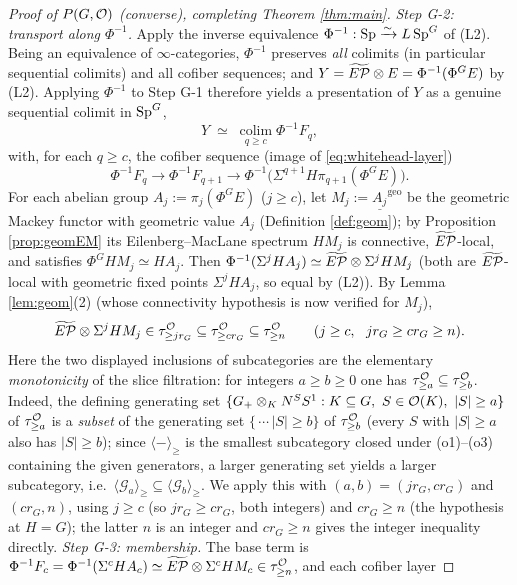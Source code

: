 \begin{proof}[Proof of $P(G,\mathcal{O})$ (converse), completing Theorem \ref{thm:main}]
\emph{Step G-2: transport along $\Phi^{-1}$.} Apply the inverse
equivalence $\Phi^{-1}:\mathrm{Sp}\xrightarrow{\sim}L\,\mathrm{Sp}^G$ of (L2). Being an
equivalence of $\infty$-categories, $\Phi^{-1}$ preserves \emph{all} colimits (in
particular sequential colimits) and all cofiber sequences; and
$Y=\widetilde{E\mathcal P}\otimes E=\Phi^{-1}(\Phi^G E)$ by (L2). Applying $\Phi^{-1}$ to Step G-1
therefore yields a presentation of $Y$ as a genuine sequential colimit in
$\mathrm{Sp}^G$,
\[
Y\;\simeq\;\operatorname*{colim}_{q\ge c}\Phi^{-1}F_q,
\]
with, for each $q\ge c$, the cofiber sequence (image of \eqref{eq:whitehead-layer})
\[
\Phi^{-1}F_q\longrightarrow\Phi^{-1}F_{q+1}\longrightarrow
\Phi^{-1}\bigl(\Sigma^{q+1}H\pi_{q+1}(\Phi^G E)\bigr).
\]
For each abelian group $A_j:=\pi_j(\Phi^G E)$ ($j\ge c$), let
$M_j:=\underline{A_j}^{\mathrm{geo}}$ be the geometric Mackey functor with
geometric value $A_j$ (Definition \ref{def:geom}); by Proposition
\ref{prop:geomEM} its Eilenberg--MacLane spectrum $HM_j$ is connective,
$\widetilde{E\mathcal P}$-local, and satisfies $\Phi^G HM_j\simeq HA_j$. Then
$\Phi^{-1}(\Sigma^j HA_j)\simeq\widetilde{E\mathcal P}\otimes\Sigma^j HM_j$ (both are $\widetilde{E\mathcal P}$-local with
geometric fixed points $\Sigma^j HA_j$, so equal by (L2)). By Lemma
\ref{lem:geom}(2) (whose connectivity hypothesis is now verified for $M_j$),
\[
\widetilde{E\mathcal P}\otimes\Sigma^j HM_j\in\tau^{\mathcal{O}}_{\ge j r_G}\subseteq\tau^{\mathcal{O}}_{\ge c r_G}
\subseteq\tau^{\mathcal{O}}_{\ge n}\qquad(j\ge c,\ \ j r_G\ge c r_G\ge n).
\]
Here the two displayed inclusions of subcategories are the elementary
\emph{monotonicity} of the slice filtration: for integers $a\ge b\ge0$ one has
$\tau^{\mathcal{O}}_{\ge a}\subseteq\tau^{\mathcal{O}}_{\ge b}$. Indeed, the defining generating
set $\{G_+\otimes_K N^S S^1: K\subseteq G,\ S\in\mathcal{O}(K),\ |S|\ge a\}$ of
$\tau^{\mathcal{O}}_{\ge a}$ is a \emph{subset} of the generating set
$\{\,\cdots\,|S|\ge b\}$ of $\tau^{\mathcal{O}}_{\ge b}$ (every $S$ with $|S|\ge a$ also
has $|S|\ge b$); since $\langle-\rangle_{\ge}$ is the smallest subcategory closed
under (o1)--(o3) containing the given generators, a larger generating set yields a
larger subcategory, i.e.\ $\langle\mathcal G_a\rangle_{\ge}\subseteq\langle\mathcal
G_b\rangle_{\ge}$. We apply this with $(a,b)=(j r_G,c r_G)$ and $(c r_G,n)$,
using $j\ge c$ (so $j r_G\ge c r_G$, both integers) and $c r_G\ge n$ (the
hypothesis at $H=G$); the latter $n$ is an integer and $c r_G\ge n$ gives the
integer inequality directly.
\emph{Step G-3: membership.} The base term is
$\Phi^{-1}F_c=\Phi^{-1}(\Sigma^c HA_c)\simeq\widetilde{E\mathcal P}\otimes\Sigma^c HM_c
\in\tau^{\mathcal{O}}_{\ge n}$, and each cofiber layer

\end{proof}
